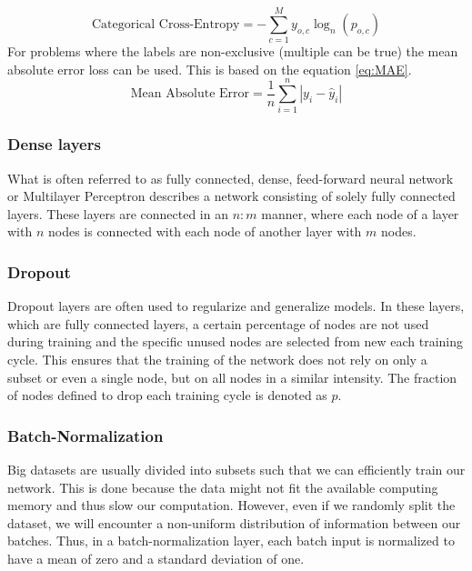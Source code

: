 \begin{equation}
\label{cce}
\text{Categorical Cross-Entropy} = -\sum_{c=1}^My_{o,c}\log_{n}(p_{o,c})
\end{equation}
For problems where the labels are non-exclusive (multiple can be true) the mean absolute error loss can be used. This is based on the equation \ref{eq:MAE}.
 \begin{equation}
 \label{eq:MAE}
     \text{Mean Absolute Error} = \frac{1}{n}\sum_{i=1}^{n} |y_i - \hat{y}_i|
 \end{equation}
 
\subsubsection{Dense layers}
What is often referred to as fully connected, dense, feed-forward neural network or Multilayer Perceptron describes a network consisting of solely fully connected layers. These layers are connected in an $n:m$ manner, where each node of a layer with $n$ nodes is connected with each node of another layer with $m$ nodes. 

\subsubsection{Dropout}
Dropout layers are often used to regularize and generalize models. In these layers, which are fully connected layers, a certain percentage of nodes are not used during training and the specific unused nodes are selected from new each training cycle. This ensures that the training of the network does not rely on only a subset or even a single node, but on all nodes in a similar intensity. The fraction of nodes defined to drop each training cycle is denoted as $p$.

\subsubsection{Batch-Normalization}
Big datasets are usually divided into subsets such that we can efficiently train our network. This is done because the data might not fit the available computing memory and thus slow our computation. However, even if we randomly split the dataset, we will encounter a non-uniform distribution of information between our batches. Thus, in a batch-normalization layer, each batch input is normalized to have a mean of zero and a standard deviation of one. 

